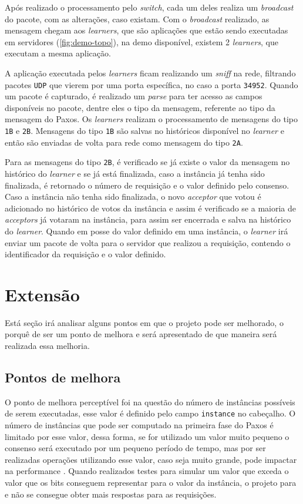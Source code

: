 \documentclass[
    12pt,
    openright, 
    oneside,
    a4paper,
    french,
    english,
    brazil
    ]{facom-ufu-abntex2}
\theoremstyle{definition}
\begin{document}


Após realizado o processamento pelo \emph{switch}, cada um deles realiza um \emph{broadcast} do pacote,
com as alterações, caso existam. Com o \emph{broadcast} realizado, as mensagem chegam aos
\emph{learners}, que são aplicações que estão sendo executadas em servidores (\ref{fig:demo-topo}), 
na demo disponível, existem 2 \emph{learners}, que executam a mesma aplicação.

A aplicação executada pelos \emph{learners} ficam realizando um \emph{sniff} na rede, filtrando pacotes
\texttt{UDP} que vierem por uma porta específica, no caso a porta \texttt{34952}. Quando um
pacote é capturado, é realizado um \emph{parse} para ter acesso as campos disponíveis no pacote, dentre
eles o tipo da mensagem, referente ao tipo da mensagem do Paxos. Os \emph{learners} realizam o processamento
de mensagens do tipo \texttt{1B} e \texttt{2B}. Mensagens do tipo \texttt{1B} são salvas no históricos
disponível no \emph{learner} e então são enviadas de volta para rede como mensagem do tipo \texttt{2A}.

Para as mensagens do tipo \texttt{2B}, é verificado se já existe o valor da mensagem no histórico
do \emph{learner} e se já está finalizada, caso a instância já tenha sido finalizada, é retornado o
número de requisição e o valor definido pelo consenso. Caso a instância não tenha sido finalizada,
o novo \emph{acceptor} que votou é adicionado no histórico de votos da instância e assim é verificado
se a maioria de \emph{acceptors} já votaram na instância, para assim ser encerrada e salva na histórico
do \emph{learner}. Quando em posse do valor definido em uma instância, o \emph{learner} irá enviar um pacote de 
volta para o servidor que realizou a requisição, contendo o identificador da requisição e o valor definido.

\section{Extensão}
Está seção irá analisar alguns pontos em que o projeto pode ser melhorado, o porquê de ser um ponto de
melhora e será apresentado de que maneira será realizada essa melhoria.

\subsection{Pontos de melhora}
O ponto de melhora perceptível foi na questão do número de instâncias possíveis de serem executadas,
esse valor é definido pelo campo \texttt{instance} no cabeçalho. O número de instâncias que pode ser 
computado na primeira fase do Paxos é limitado por esse valor, dessa forma, se for utilizado um valor
muito pequeno o consenso será executado por um pequeno período de tempo, mas por ser realizadas operações
utilizando esse valor, caso seja muito grande, pode impactar na performance \cite{dang2016paxos}. 
Quando realizados testes para simular um valor que exceda o valor que os bits conseguem representar 
para o valor da instância, o projeto para e não se consegue obter mais respostas para as requisições.
\end{document}
